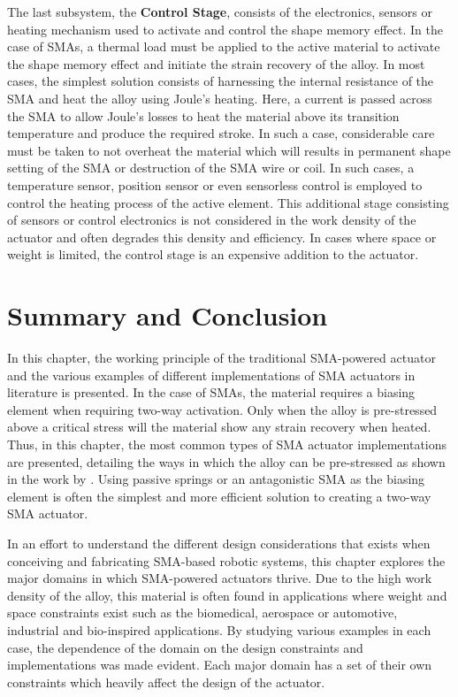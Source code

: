 The last subsystem, the \textbf{Control Stage}, consists of the electronics, sensors or heating mechanism used to activate and control the shape memory effect. In the case of SMAs, a thermal load must be applied to the active material to activate the shape memory effect and initiate the strain recovery of the alloy. In most cases, the simplest solution consists of harnessing the internal resistance of the SMA and heat the alloy using Joule's heating. Here, a current is passed across the SMA to allow Joule's losses to heat the material above its transition temperature and produce the required stroke. In such a case, considerable care must be taken to not overheat the material which will results in permanent shape setting of the SMA or destruction of the SMA wire or coil. In such cases, a temperature sensor, position sensor or even sensorless control is employed to control the heating process of the active element. This additional stage consisting of sensors or control electronics is not considered in the work density of the actuator and often degrades this density and efficiency. In cases where space or weight is limited, the control stage is an expensive addition to the actuator.
\section{Summary and Conclusion}
In this chapter, the working principle of the traditional SMA-powered actuator and the various examples of different implementations of SMA actuators in literature is presented. In the case of SMAs, the material requires a biasing element when requiring two-way activation. Only when the alloy is pre-stressed above a critical stress will the material show any strain recovery when heated. Thus, in this chapter, the most common types of SMA actuator implementations are presented, detailing the ways in which the alloy can be pre-stressed as shown in the work by \cite{bellouardShapeMemoryAlloys2008}. Using passive springs or an antagonistic SMA as the biasing element is often the simplest and more efficient solution to creating a two-way SMA actuator.

In an effort to understand the different design considerations that exists when conceiving and fabricating SMA-based robotic systems, this chapter explores the major domains in which SMA-powered actuators thrive. Due to the high work density of the alloy, this material is often found in applications where weight and space constraints exist such as the biomedical, aerospace or automotive, industrial and bio-inspired applications. By studying various examples in each case, the dependence of the domain on the design constraints and implementations was made evident. Each major domain has a set of their own constraints which heavily affect the design of the actuator.

